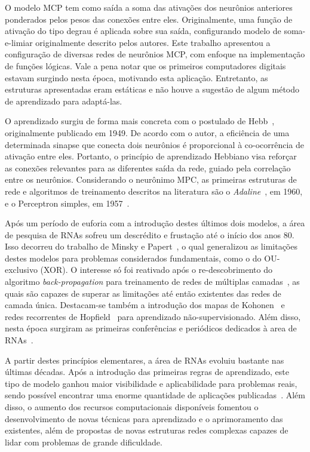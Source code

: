 \documentclass[conference]{IEEEtran}
\begin{document}
	O modelo MCP tem como saída a soma das ativações dos neurônios anteriores ponderados pelos pesos das conexões entre eles. Originalmente, uma função de ativação do tipo degrau é aplicada sobre sua saída, configurando modelo de soma-e-limiar originalmente descrito pelos autores. Este trabalho apresentou a configuração de diversas redes de neurônios MCP, com enfoque na implementação de funções lógicas. Vale a pena notar que os primeiros computadores digitais estavam surgindo nesta época, motivando esta aplicação. Entretanto, as estruturas apresentadas eram estáticas e não houve a sugestão de algum método de aprendizado para adaptá-las.
	
	O aprendizado surgiu de forma mais concreta com o postulado de Hebb~\cite{hebb1949organization}, originalmente publicado em 1949. De acordo com o autor, a eficiência de uma determinada sinapse que conecta dois neurônios é proporcional à co-ocorrência de ativação entre eles. Portanto, o princípio de aprendizado Hebbiano visa reforçar as conexões relevantes para as diferentes saída da rede, guiado pela correlação entre os neurônios. Considerando o neurônimo MPC, as primeiras estruturas de rede e algoritmos de treinamento descritos na literatura são o \textit{Adaline}~\cite{widrow1960adaptive}, em 1960, e o Perceptron simples, em 1957~\cite{rosenblatt1957perceptron}.
	
	Após um período de euforia com a introdução destes últimos dois modelos, a área de pesquisa de RNAs sofreu um descrédito e frustação até o início dos anos 80. Isso decorreu  do trabalho de Minsky e Papert~\cite{minsky1969introduction}, o qual generalizou as limitações destes modelos para problemas considerados fundamentais, como o do OU-exclusivo (XOR). O interesse só foi reativado após o re-descobrimento do algoritmo \textit{back-propagation} para treinamento de redes de múltiplas camadas~\cite{rumelhart1985learning}, as quais são capazes de superar as limitações até então existentes das redes de camada única. Destacam-se também a introdução dos mapas de Kohonen~\cite{kohonen1982self} e redes recorrentes de Hopfield~\cite{hopfield1982neural} para aprendizado não-supervisionado. Além disso, nesta época surgiram as primeiras conferências e periódicos dedicados à area de RNAs~\cite{macukow2016neural}.
	
	A partir destes princípios elementares, a área de RNAs evoluiu bastante nas últimas décadas. Após a introdução das primeiras regras de aprendizado, este tipo de modelo ganhou maior visibilidade e aplicabilidade para problemas reais, sendo possível encontrar uma enorme quantidade de aplicações publicadas~\cite{abiodun2018state}. Além disso, o aumento dos recursos computacionais disponíveis fomentou o desenvolvimento de novas técnicas para aprendizado e o aprimoramento das existentes, além de propostas de novas estruturas redes complexas capazes de lidar com problemas de grande dificuldade.
	
\end{document}
